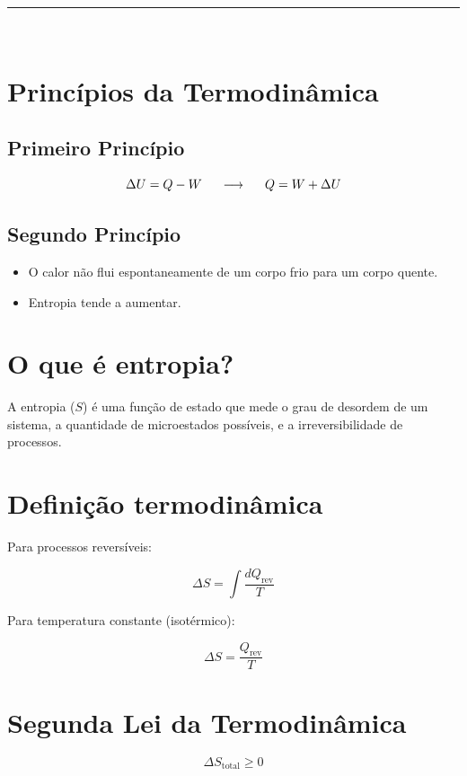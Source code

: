 \documentclass[a4paper,12pt]{article}
\begin{document}
\noindent\rule{\linewidth}{0.6pt}\\

\section*{Princ\'ipios da Termodinâmica}

\subsection*{Primeiro Princípio}
\begin{equation*}
    \Delta U = Q - W   \hspace{0.5cm} \longrightarrow \hspace{0.5cm} Q = W + \Delta U
\end{equation*}
\subsection*{Segundo Princípio}
\begin{itemize}
    \item O calor não flui espontaneamente de um corpo frio para um corpo quente.
    \item Entropia tende a aumentar.
\end{itemize}

\section*{O que é entropia?}
A entropia (\(S\)) é uma função de estado que mede o grau de desordem de um sistema, a quantidade de microestados possíveis, e a irreversibilidade de processos.

\section*{Definição termodinâmica}
Para processos reversíveis:

\[
\Delta S = \int \frac{dQ_{\text{rev}}}{T}
\]

Para temperatura constante (isotérmico):

\[
\Delta S = \frac{Q_{\text{rev}}}{T}
\]

\section*{Segunda Lei da Termodinâmica}

\[
\Delta S_{\text{total}} \geq 0
\]
\end{document}
